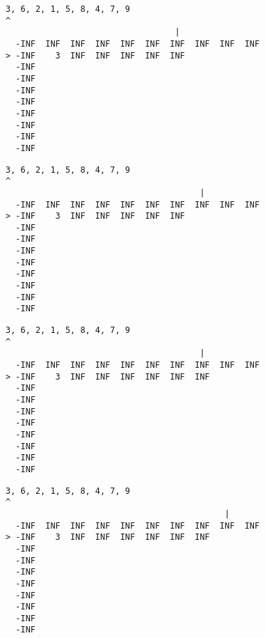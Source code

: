 { \begin{verbatim}
3, 6, 2, 1, 5, 8, 4, 7, 9
^
                                  |
  -INF  INF  INF  INF  INF  INF  INF  INF  INF  INF
> -INF    3  INF  INF  INF  INF  INF               
  -INF                                             
  -INF                                             
  -INF                                             
  -INF                                             
  -INF                                             
  -INF                                             
  -INF                                             
  -INF                                             
\end{verbatim} }

{ \begin{verbatim}
3, 6, 2, 1, 5, 8, 4, 7, 9
^
                                       |
  -INF  INF  INF  INF  INF  INF  INF  INF  INF  INF
> -INF    3  INF  INF  INF  INF  INF               
  -INF                                             
  -INF                                             
  -INF                                             
  -INF                                             
  -INF                                             
  -INF                                             
  -INF                                             
  -INF                                             
\end{verbatim} }

{ \begin{verbatim}
3, 6, 2, 1, 5, 8, 4, 7, 9
^
                                       |
  -INF  INF  INF  INF  INF  INF  INF  INF  INF  INF
> -INF    3  INF  INF  INF  INF  INF  INF          
  -INF                                             
  -INF                                             
  -INF                                             
  -INF                                             
  -INF                                             
  -INF                                             
  -INF                                             
  -INF                                             
\end{verbatim} }

{ \begin{verbatim}
3, 6, 2, 1, 5, 8, 4, 7, 9
^
                                            |
  -INF  INF  INF  INF  INF  INF  INF  INF  INF  INF
> -INF    3  INF  INF  INF  INF  INF  INF          
  -INF                                             
  -INF                                             
  -INF                                             
  -INF                                             
  -INF                                             
  -INF                                             
  -INF                                             
  -INF                                             
\end{verbatim} }

